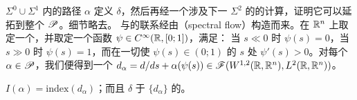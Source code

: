 $\Sigma^0\cup\Sigma^1$ 内的路径 $\alpha$ 定义 $\delta$，然后再经一个涉及下一\trStratum{}
$\Sigma^2$ 的\trLink{}的计算，证明它可以延拓到整个 $\mathscr{P}$。细节略去。
与\trDeterminantLine{}\trLineBundle{}的联系经由\textbf{\trSpectralFlow}（spectral flow）构造而来。在 $\mathbb{R}^n$
上取定一个\trInnerProduct，并取定一个函数 $\psi\in C^{\infty}(\mathbb{R},[0;1])$，满足：
当 $s\ll 0$ 时 $\psi(s)=0$，当 $s\gg 0$ 时 $\psi(s)=1$，而在一切使
$\psi(s)\in(0;1)$ 的 $s$ 处 $\psi'(s)>0$。对每个 $\alpha\in\mathscr{P}$，我们便得到一个%
\trFredholmOperator{} $d_{\alpha}=d/ds+\alpha(\psi(s))\in
\mathscr{F}(W^{1,2}(\mathbb{R},\mathbb{R}^n),L^2(\mathbb{R},\mathbb{R}^n))$。
\begin{lemma}\label{thm:spectral-flow-index}
$I(\alpha)=\mathrm{index}(d_{\alpha})$；而且 $\delta$ \trCanonical\trIsomorphic{}于%
\trFamily{} $\{d_{\alpha}\}$ 的\trDeterminantLine{}\trLineBundle。
\end{lemma}
